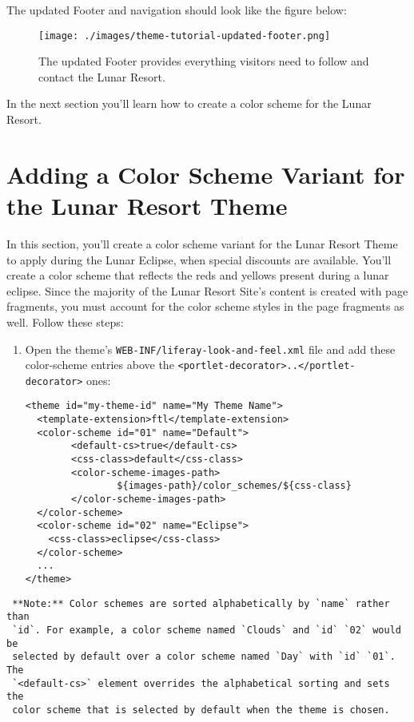 The updated Footer and navigation should look like the figure below:

\begin{figure}
\centering
\texttt{[image: ./images/theme-tutorial-updated-footer.png]}
\caption{The updated Footer provides everything visitors need to follow
and contact the Lunar Resort.}
\end{figure}

In the next section you'll learn how to create a color scheme for the
Lunar Resort.

\chapter{Adding a Color Scheme Variant for the Lunar Resort
Theme}\label{adding-a-color-scheme-variant-for-the-lunar-resort-theme}

In this section, you'll create a color scheme variant for the Lunar
Resort Theme to apply during the Lunar Eclipse, when special discounts
are available. You'll create a color scheme that reflects the reds and
yellows present during a lunar eclipse. Since the majority of the Lunar
Resort Site's content is created with page fragments, you must account
for the color scheme styles in the page fragments as well. Follow these
steps:

\begin{enumerate}
\def\labelenumi{\arabic{enumi}.}
\item
  Open the theme's \texttt{WEB-INF/liferay-look-and-feel.xml} file and
  add these color-scheme entries above the
  \texttt{\textless{}portlet-decorator\textgreater{}..\textless{}/portlet-decorator\textgreater{}}
  ones:

\begin{verbatim}
<theme id="my-theme-id" name="My Theme Name">
  <template-extension>ftl</template-extension>
  <color-scheme id="01" name="Default">
        <default-cs>true</default-cs>
        <css-class>default</css-class>
        <color-scheme-images-path>
                ${images-path}/color_schemes/${css-class}
        </color-scheme-images-path>
  </color-scheme>
  <color-scheme id="02" name="Eclipse">
    <css-class>eclipse</css-class>
  </color-scheme>
  ...
</theme>
\end{verbatim}
\end{enumerate}

\noindent\hrulefill

\begin{verbatim}
 **Note:** Color schemes are sorted alphabetically by `name` rather than 
 `id`. For example, a color scheme named `Clouds` and `id` `02` would be 
 selected by default over a color scheme named `Day` with `id` `01`. The 
 `<default-cs>` element overrides the alphabetical sorting and sets the 
 color scheme that is selected by default when the theme is chosen.  
\end{verbatim}

